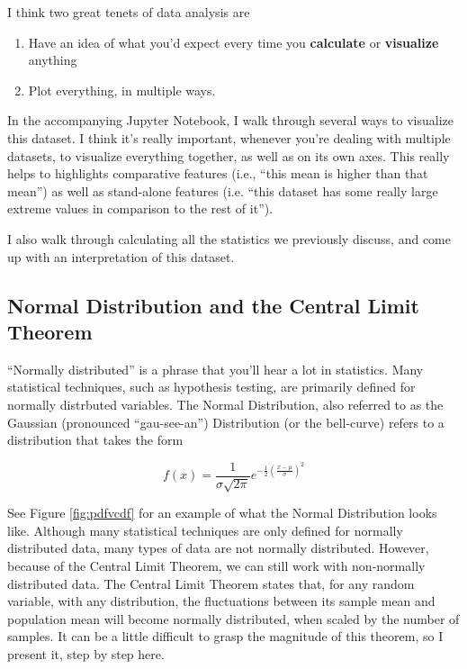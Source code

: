 \documentclass{article}
\begin{document}
I think two great tenets of data analysis are
\begin{enumerate}
\item Have an idea of what you'd expect every time you \textbf{calculate} or \textbf{visualize} anything
\item\label{item:5} Plot everything, in multiple ways. 
\end{enumerate}

In the accompanying Jupyter Notebook, I walk through several ways to visualize this dataset. I think it's really important, whenever you're dealing with multiple datasets, to visualize everything together, as well as on its own axes. This really helps to highlights comparative features (i.e., ``this mean is higher than that mean'') as well as stand-alone features (i.e. ``this dataset has some really large extreme values in comparison to the rest of it'').

I also walk through calculating all the statistics we previously discuss, and come up with an interpretation of this dataset.

\subsection{Normal Distribution and the Central Limit Theorem}
``Normally distributed'' is a phrase that you'll hear a lot in statistics. Many statistical techniques, such as hypothesis testing, are primarily defined for normally distrbuted variables. The Normal Distribution, also referred to as the Gaussian (pronounced ``gau-see-an'') Distribution (or the bell-curve) refers to a distribution that takes the form

\begin{equation}
\label{eq:13}
f(x) = \frac{1}{\sigma\sqrt{2\pi}}e^{-\frac{1}{2} \left( \frac{x - \mu}{\sigma} \right)^{2}}
\end{equation}

See Figure \ref{fig:pdfvcdf} for an example of what the Normal Distribution looks like. Although many statistical techniques are only defined for normally distributed data, many types of data are not normally distributed. However, because of the Central Limit Theorem, we can still work with non-normally distributed data. The Central Limit Theorem states that, for any random variable, with any distribution, the fluctuations between its sample mean and population mean will become normally distributed, when scaled by the number of samples. It can be a little difficult to grasp the magnitude of this theorem, so I present it, step by step here. 
\end{document}
